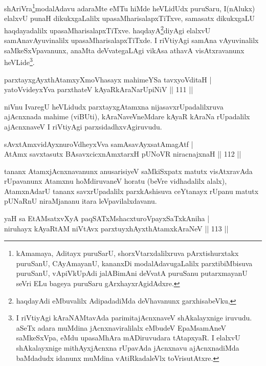 \begin{artha}
shAriVra\footnote{kAmamaya, Aditayx puruSarU, shorxVtarxdalilxruva pArxtishurxtakx puruSanU, CAyAmayanU, kananxDi modalAdavugaLalilx parxtibiMbisuva puruSanU, vApiVkUpAdi jalABimAni deVvatA puruSanu putarxmayanU seVri ELu bageya puruSaru gArxhayxrAgidAdxre.}modalAdavu adaraMte eMTu hiMde heVLidUdx puruSaru, I(nAlukx) elalxvU punaH dikukxgaLalilx upasaMharisalapxTiTxve, samasatx dikukxgaLU haqdayadalilx upasaMharisalapxTiTxve. haqdayA\footnote{haqdayAdi eMbuvalilx AdipadadiMda deVhavanunx garxhisabeVku,}diyAgi elalxvU samAnavAyuvinalilx upasaMharisalapxTiTxde. I riVtiyAgi samAna vAyuvinalilx saMkeSxVpavanunx, anaMta deVvategaLAgi vikAsa athavA visAtxravanunx heVLide\footnote{I riVtiyAgi kAraNAMtavAda parimitajAcnxnaveV shAkalayxnige iruvudu. aSeTx adara muMdina jAcnxnaviralilalx eMbudeV EpaMsamAneV saMkeSxVpa, eMdu upasaMhAra mADiruvudara tAtapxyaR. I elalxvU shAkalayxnige mithAyxjAcnxna rUpavAda jAcnxnavu ajAcnxnadiMda baMdadudx idanunx muMdina vAtiRkadaleVlx toVrisutAtxre.}.
\end{artha}

\begin{shl}
parxtayxgAyxthAtamxyXmoVhasayx mahimeYSa tavxyoVditaH |\\
yatoV\s videyxYva parxthateV kAyaRkAraNarUpiNiV \hfill || 111 ||
\end{shl}

\begin{artha}%
niVnu IvaregU heVLidudx parxtayxgAtamxna nijasavxrUpadalilxruva ajAcnxnada mahime (viBUti), kAraNaveVneMdare kAyaR kAraNa rUpadalilx ajAcnxnaveV I riVtiyAgi parxsidadhxvAgiruvudu.
\end{artha}


\begin{shl}
sAvxtAmxvidAyxnuroVdheyxVva samAsavAyxsatAmagAtf |\\
AtAmx savxtasutx BAsavxcicxnAmxtarxH pUNoVR niracnajxnaH \hfill || 112 ||
\end{shl}

\begin{artha}
tananx AtamxjAcnxnavanunx anusarisiyeV saMkiSxpatx matutx visAtxravAda rUpavanunx Atamxnu hoMdiruvaneV horatu (beVre vidhadalilx alalx), AtamxnAdarU tananx savxrUpadalilx parxkAshisuva ceYtanayx rUpanu matutx pUNaRnU niraMjananu itara leVpavilalxdavanu.
\end{artha}

\begin{shl}
yaH sa EtAMsatxvXyA paqSATxMshacxturoV\s payxSaTxkAniha |\\
niruhayx kAyaRtAM niVtAvx parxtuyxhAyxthA\s \s tamxkAraNeV \hfill || 113 ||
\end{shl}

